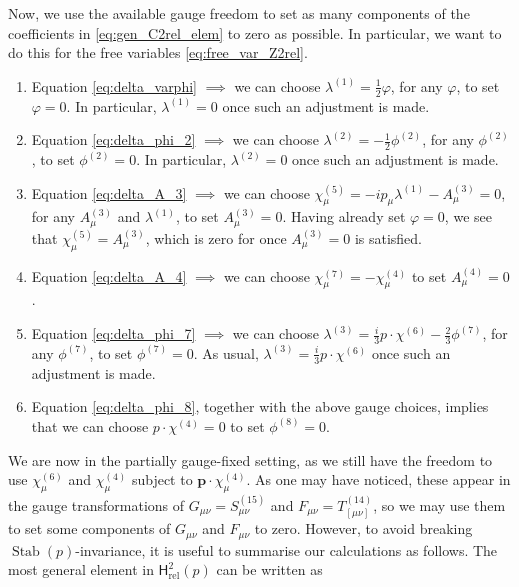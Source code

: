\documentclass[11pt,reqno,a4paper,final]{amsart}
\theoremstyle{plain}
\theoremstyle{definition}
\newcommand{\p}{\boldsymbol{p}}
\newcommand{\Hrel}{\mathsf{H}_{\mathrm{rel}}}
\newcommand{\phisup}[1]{\phi^{(#1)}}
\newcommand{\Asup}[1]{A^{(#1)}}
\newcommand{\Stab}{\operatorname{Stab}}
\newcommand{\1}{\mathbb{1}}
\numberwithin{equation}{section}
\begin{document}
\begin{appendices}
Now, we use the available gauge freedom to set as many components of
the coefficients in \eqref{eq:gen_C2rel_elem} to zero as possible. In
particular, we want to do this for the free variables
\eqref{eq:free_var_Z2rel}.
\begin{enumerate}
    \item Equation \eqref{eq:delta_varphi} $\implies$ we can choose
      $\lambda^{(1)} =  \tfrac12 \varphi$, for any $\varphi$, to set
      $\varphi = 0$. In particular, $\lambda^{(1)} = 0$ once such an
      adjustment is made.
    \item Equation \eqref{eq:delta_phi_2} $\implies$ we can choose
      $\lambda^{(2)} = -\tfrac12 \phisup{2}$, for any $\phisup{2}$, to
      set $\phisup{2} = 0$. In particular, $\lambda^{(2)} = 0$ once
      such an adjustment is made.
    \item Equation \eqref{eq:delta_A_3} $\implies$ we can choose
      $\chi^{(5)}_\mu = -ip_\mu \lambda^{(1)} - \Asup{3}_\mu  = 0$,
      for any $\Asup{3}_\mu$ and $\lambda^{(1)}$, to set $\Asup{3}_\mu
      = 0$. Having already set $\varphi = 0$, we see that
      $\chi^{(5)}_\mu = \Asup{3}_\mu$, which is zero for once
      $\Asup{3}_\mu = 0$ is satisfied.
    \item Equation \eqref{eq:delta_A_4} $\implies$ we can choose
      $\chi^{(7)}_\mu = -\chi^{(4)}_\mu$ to set $\Asup{4}_\mu = 0$.
    \item Equation \eqref{eq:delta_phi_7} $\implies$ we can choose
      $\lambda^{(3)} = \tfrac i3 p \cdot \chi^{(6)} - \tfrac23
      \phisup{7}$, for any $\phisup{7}$, to set $\phisup{7} = 0$. As
      usual, $\lambda^{(3)} = \tfrac i3 p \cdot \chi^{(6)}$ once such
      an adjustment is made.
    \item Equation \eqref{eq:delta_phi_8}, together with the above
      gauge choices, implies that we can choose $p\cdot \chi^{(4)} =
      0$ to set $\phisup{8} = 0$.
\end{enumerate}
We are now in the partially gauge-fixed setting, as we still have the
freedom to use $\chi^{(6)}_\mu$ and $\chi^{(4)}_\mu$ subject to $\p
\cdot \chi^{(4)}_\mu$. As one may have noticed, these appear in the
gauge transformations of $G_{\mu\nu} = S^{(15)}_{\mu\nu}$ and
$F_{\mu\nu} = T^{(14)}_{[\mu\nu]}$, so we may use them to set some
components of $G_{\mu\nu}$ and $F_{\mu\nu}$ to zero.  However, to
avoid breaking $\Stab(p)$-invariance, it is useful to summarise our
calculations as follows.  The most general element in $\Hrel^2(p)$ can
be written as
\begin{equation}\label{eq:Zrel2-vertex-operators}

\end{equation}
\end{appendices}
\end{document}
